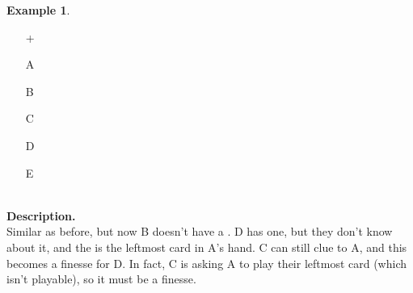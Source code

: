 \documentclass[a4paper]{article}
\theoremstyle{plain}
\theoremstyle{definition}
\newtheorem{example}[theorem]{Example}
\begin{document}
\begin{example}	\hfill \\
	\begin{minipage}{0.45\textwidth}
		\begin{itemize}
			\item[\Large +]      
			\item[\Large A]    
			\item[\Large B]    
			\item[\Large C]    
			\item[\Large D]    
			\item[\Large E]    
		\end{itemize}
	\end{minipage}%
	\begin{minipage}{0.55\textwidth}
		\hfill \\
		
		\textbf{Description.} \\
		
		Similar as before, but now B doesn't have a . D has one, but they don't know about it, and the  is the leftmost card in A's hand. C can still clue  to A, and this becomes a finesse for D. In fact, C is asking A to play their leftmost card (which isn't playable), so it must be a finesse.
	\end{minipage}
\end{example} \vspace{0.15 cm}
\end{document}

